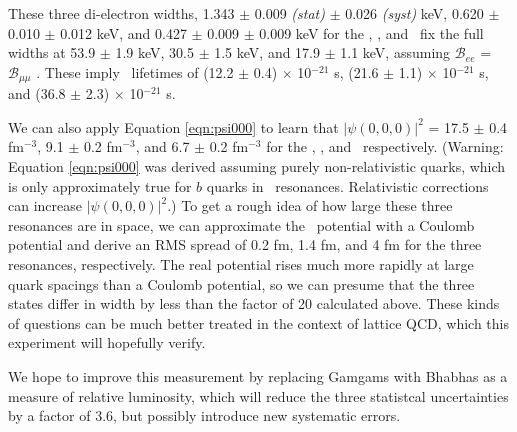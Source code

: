 \documentclass[aps,prd,preprint,superscriptaddress,tightenlines,nofootinbib,floatfix]{revtex4}
\begin{document}
These three di-electron widths, 1.343 $\pm$ 0.009 {\it (stat)} $\pm$
0.026 {\it (syst)} keV, 0.620 $\pm$ 0.010 $\pm$ 0.012 keV, and 0.427
$\pm$ 0.009 $\pm$ 0.009 keV for the \uone, \utwo, and \uthree\ fix the
full widths at 53.9 $\pm$ 1.9 keV, 30.5 $\pm$ 1.5 keV, and 17.9 $\pm$
1.1 keV, assuming $\mathcal{B}_{ee}$ = $\mathcal{B}_{\mu\mu}$
\cite{istvan}.  These imply \ups\ lifetimes of (12.2 $\pm$ 0.4)
$\times$ 10$^{-21}$ s, (21.6 $\pm$ 1.1) $\times$ 10$^{-21}$ s, and
(36.8 $\pm$ 2.3) $\times$ 10$^{-21}$ s.

We can also apply Equation \ref{eqn:psi000} to learn that
$|\psi(0,0,0)|^2$ = 17.5 $\pm$ 0.4 fm$^{-3}$, 9.1 $\pm$ 0.2 fm$^{-3}$,
and 6.7 $\pm$ 0.2 fm$^{-3}$ for the \uone, \utwo, and \uthree\
respectively.  (Warning: Equation \ref{eqn:psi000} was derived
assuming purely non-relativistic quarks, which is only approximately
true for $b$ quarks in \ups\ resonances.  Relativistic corrections can
increase $|\psi(0,0,0)|^2$.)  To get a rough idea of how large these
three resonances are in space, we can approximate the \bbar\ potential
with a Coulomb potential and derive an RMS spread of 0.2 fm, 1.4 fm,
and 4 fm for the three resonances, respectively.  The real potential
rises much more rapidly at large quark spacings than a Coulomb
potential, so we can presume that the three states differ in width by
less than the factor of 20 calculated above.  These kinds of questions
can be much better treated in the context of lattice QCD, which this
experiment will hopefully verify.

We hope to improve this measurement by replacing Gamgams with Bhabhas
as a measure of relative luminosity, which will reduce the three
statistcal uncertainties by a factor of 3.6, but possibly introduce
new systematic errors.
\end{document}
